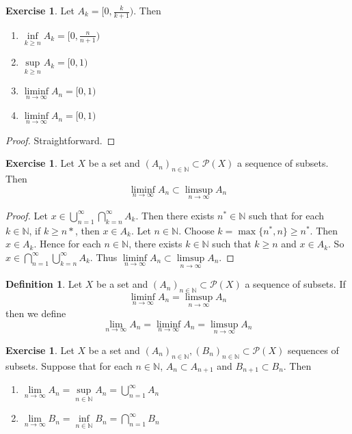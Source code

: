 \documentclass{book}
\theoremstyle{definition}
\newtheorem{defn}[definition]{Definition}
\newtheorem{ex}[definition]{Exercise}
\newcommand{\N}{\mathbb{N}}
\newcommand{\MP}{\mathcal{P}}
\newcommand{\lex}[1]{\label{ex:#1}}
\newcommand{\ld}[1]{\label{defn:#1}}
\DeclareMathOperator*{\0}{\mbf{0}}
\DeclareMathOperator*{\1}{\mbf{1}}
\newcommand{\limn}{\lim \limits_{n \rightarrow \infty}}
\begin{document}
	\begin{ex} \lex{00000} 
		Let $A_k = [0, \frac{k}{k+1})$. Then 
		\begin{enumerate}
			\item $\inf\limits_{k \geq n}A_k = [0, \frac{n}{n+1})$ \\
			\item $\sup\limits_{k \geq n}A_k = [0,1)$ \\
			\item $\liminf\limits_{n \rightarrow \infty}A_n = [0,1)$ \\
			\item $\liminf\limits_{n \rightarrow \infty}A_n = [0,1)$
		\end{enumerate}
	\end{ex}
	
	\begin{proof}
		Straightforward.
	\end{proof}
	
	\begin{ex} \lex{00000} 
		Let $X$ be a set and $(A_n)_{n \in \N} \subset \MP(X)$ a sequence of subsets. Then $$\liminf_{n \rightarrow \infty} A_n \subset \limsup_{n \rightarrow \infty} A_n$$
	\end{ex}
	
	\begin{proof}
		Let $x \in \bigcup\limits_{n=1}^{\infty} \bigcap\limits_{k =n}^{\infty} A_k$. Then there exists $n^* \in \N$ such that for each $k \in \N$, if $k \geq n*$, then $x \in A_k$. Let $n \in \N$. Choose $k = \max\{n^*,n\} \geq n^*$. Then $x \in A_k$. Hence for each $n \in \N$, there exists $k \in \N$ such that $k \geq n$ and $x \in A_k$. So $x \in \bigcap\limits_{n=1}^{\infty} \bigcup\limits_{k=n}^{\infty} A_k$. Thus $\liminf\limits_{n \rightarrow \infty}A_n \subset \limsup\limits_{n \rightarrow \infty}A_n$.
	\end{proof}
	
	\begin{defn} \ld{00000} 
		Let $X$ be a set and $(A_n)_{n \in \N} \subset \MP(X)$ a sequence of subsets. If $$\liminf_{n \rightarrow \infty} A_n = \limsup_{n \rightarrow \infty} A_n$$ then we define $$\lim_{n \rightarrow \infty}A_n = \liminf_{n \rightarrow \infty} A_n = \limsup_{n \rightarrow \infty} A_n$$ 
	\end{defn}
	
	\begin{ex} \lex{00000} 
		Let $X$ be a set and $(A_n)_{n \in \N}, (B_n)_{n \in \N} \subset \MP(X)$ sequences of subsets. Suppose that for each $n \in \N$, $A_n \subset A_{n+1}$ and $B_{n+1} \subset B_n$. Then 
		\begin{enumerate}
			\item $\limn A_n = \sup\limits_{n \in \N}A_n = \bigcup\limits_{n=1}^{\infty}A_n$
			\item $\limn B_n = \inf\limits_{n \in \N}B_n = \bigcap\limits_{n=1}^{\infty}B_n$
		\end{enumerate}
	\end{ex}
	
\end{document}
